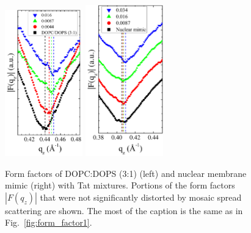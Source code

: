 \begin{figure}[htbp]
  \centering
  \includegraphics[width=0.3\textwidth]{figures/Tat/NFIT_results/DOPCDOPS3to1_form_factors}
  \qquad  
  \includegraphics[width=0.3\textwidth]{figures/Tat/NFIT_results/nuclear_form_factors}
  \caption[Form factors of DOPC:DOPS (3:1) (left) and nuclear membrane mimic 
  (right) with Tat mixtures]
  {Form factors of DOPC:DOPS (3:1) (left) and nuclear membrane mimic 
  (right) with Tat mixtures.
  Portions of the form factors $|F(q_z)|$ that were not significantly distorted 
  by mosaic spread scattering are shown.
  The most of the caption is the same as in Fig.~\ref{fig:form_factor1}.}
  \label{fig:form_factor4}
\end{figure}

\newpage

